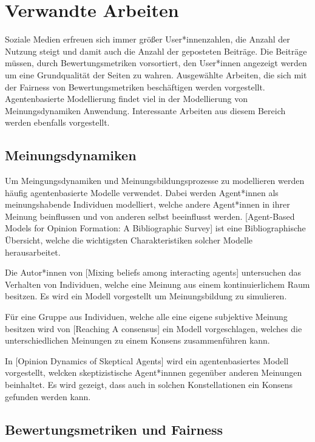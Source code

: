\chapter{Verwandte Arbeiten}

Soziale Medien erfreuen sich immer größer User*innenzahlen, die Anzahl der Nutzung steigt und damit auch die Anzahl der geposteten Beiträge. Die Beiträge müssen, durch Bewertungsmetriken vorsortiert, den User*innen angezeigt werden um eine Grundqualität der Seiten zu wahren. Ausgewählte Arbeiten, die sich mit der Fairness von Bewertungsmetriken beschäftigen werden vorgestellt. Agentenbasierte Modellierung findet viel in der Modellierung von Meinungsdynamiken Anwendung. Interessante Arbeiten aus diesem Bereich werden ebenfalls vorgestellt.



\section{Meinungsdynamiken}

Um Meingungsdynamiken und Meinungsbildungsprozesse zu modellieren werden häufig agentenbasierte Modelle verwendet. Dabei werden Agent*innen als meinungshabende Individuen modelliert, welche andere Agent*innen in ihrer Meinung beinflussen und von anderen selbst beeinflusst werden. [Agent-Based Models for Opinion Formation: A Bibliographic Survey] ist eine Bibliographische Übersicht, welche die wichtigsten Charakteristiken solcher Modelle herausarbeitet.

Die Autor*innen von [Mixing beliefs among interacting agents] untersuchen das Verhalten von Individuen, welche eine Meinung aus einem kontinuierlichem Raum besitzen. Es wird ein Modell vorgestellt um Meinungsbildung zu simulieren.

Für eine Gruppe aus Individuen, welche alle eine eigene subjektive Meinung besitzen wird von [Reaching A consensus] ein Modell vorgeschlagen, welches die unterschiedlichen Meinungen zu einem Konsens zusammenführen kann.

In [Opinion Dynamics of Skeptical Agents] wird ein agentenbasiertes Modell vorgestellt, welcken skeptizistische Agent*innnen gegenüber anderen Meinungen beinhaltet. Es wird gezeigt, dass auch in solchen Konstellationen ein Konsens gefunden werden kann.

\section{Bewertungsmetriken und Fairness}

